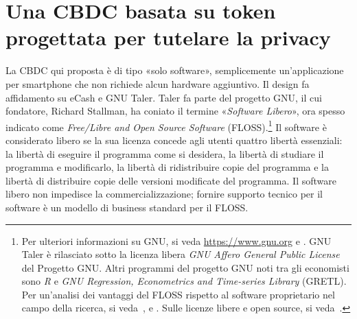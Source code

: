 \documentclass{article}
\begin{document}
\section{Una CBDC basata su token progettata per tutelare la privacy}
\label{4.-una-cbdc-basata-su-token-progettata-per-tutelare-la-privacy}

La CBDC qui proposta è di tipo «solo software», semplicemente
un'applicazione per smartphone che non richiede alcun hardware aggiuntivo.
Il design fa affidamento su eCash e GNU Taler. Taler fa parte del progetto
GNU, il cui fondatore, Richard Stallman, ha coniato il termine
«\emph{Software Libero}», ora spesso indicato come \textit{Free/Libre
and Open Source Software} (FLOSS).\footnote{Per ulteriori informazioni
su GNU, si veda \url{https://www.gnu.org} e \cite{Stallman}. GNU Taler
è rilasciato sotto la licenza libera \textit{GNU Affero General Public
License} del Progetto GNU. Altri programmi del progetto GNU noti tra gli
economisti sono \textit{R} e \textit{GNU Regression, Econometrics and
Time-series Library} (GRETL). Per un'analisi dei vantaggi del FLOSS
rispetto al software proprietario nel campo della ricerca, si veda~\cite{Baiocchi}, \cite{Yalta2008} e \cite{Yalta2010}.
Sulle licenze libere e open source, si veda~\cite{Lerner}.} Il software
è considerato libero se la sua licenza concede agli utenti quattro libertà
essenziali: la libertà di eseguire il programma come si desidera, la
libertà di studiare il programma e modificarlo, la libertà di ridistribuire
copie del programma e la libertà di distribuire copie delle versioni
modificate del programma. Il software libero non impedisce la
commercializzazione; fornire supporto tecnico per il software è un modello
di business standard per il FLOSS.
\end{document}
